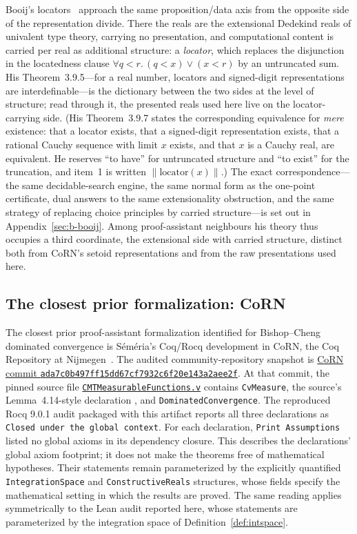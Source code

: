 \documentclass[11pt]{article}
\theoremstyle{definition}
\theoremstyle{remark}
\begin{document}
Booij's locators~\cite{booij-2021} approach the same proposition/data axis from the opposite side of the representation divide.  There the reals are the extensional Dedekind reals of univalent type theory, carrying no presentation, and computational content is carried per real as additional structure: a \emph{locator}, which replaces the disjunction in the locatedness clause $\forall q<r.\,(q<x)\lor(x<r)$ by an untruncated sum.  His Theorem~3.9.5---for a real number, locators and signed-digit representations are interdefinable---is the dictionary between the two sides at the level of structure; read through it, the presented reals used here live on the locator-carrying side.  (His Theorem~3.9.7 states the corresponding equivalence for \emph{mere} existence: that a locator exists, that a signed-digit representation exists, that a rational Cauchy sequence with limit $x$ exists, and that $x$ is a Cauchy real, are equivalent.  He reserves ``to have'' for untruncated structure and ``to exist'' for the truncation, and item~1 is written $\lVert\mathrm{locator}(x)\rVert$.)  The exact correspondence---the same decidable-search engine, the same normal form as the one-point certificate, dual answers to the same extensionality obstruction, and the same strategy of replacing choice principles by carried structure---is set out in Appendix~\ref{sec:b-booij}.  Among proof-assistant neighbours his theory thus occupies a third coordinate, the extensional side with carried structure, distinct both from CoRN's setoid representations and from the raw presentations used here.

\subsection*{The closest prior formalization: CoRN}
The closest prior proof-assistant formalization identified for Bishop--Cheng dominated convergence is S\'em\'eria's Coq/Rocq development in CoRN, the Coq Repository at Nijmegen~\cite{corn-cmtmeasurablefunctions}.  The audited community-repository snapshot is \href{https://github.com/rocq-community/corn/tree/ada7c0b497ff15dd67cf7932c6f20e143a2aee2f}{CoRN commit \texttt{ada7c0b497ff15dd67cf7932c6f20e143a2aee2f}}.  At that commit, the pinned source file \href{https://github.com/rocq-community/corn/blob/ada7c0b497ff15dd67cf7932c6f20e143a2aee2f/reals/stdlib/CMTMeasurableFunctions.v}{\texttt{CMTMeasurableFunctions.v}} contains \texttt{CvMeasure}, the source's Lemma~4.14-style declaration , and \texttt{DominatedConvergence}.  The reproduced Rocq 9.0.1 audit packaged with this artifact reports all three declarations as \texttt{Closed under the global context}.  For each declaration, \texttt{Print Assumptions} listed no global axioms in its dependency closure.  This describes the declarations' global axiom footprint; it does not make the theorems free of mathematical hypotheses.  Their statements remain parameterized by the explicitly quantified \texttt{IntegrationSpace} and \texttt{ConstructiveReals} structures, whose fields specify the mathematical setting in which the results are proved.  The same reading applies symmetrically to the Lean audit reported here, whose statements are parameterized by the integration space of Definition~\ref{def:intspace}.
\end{document}
